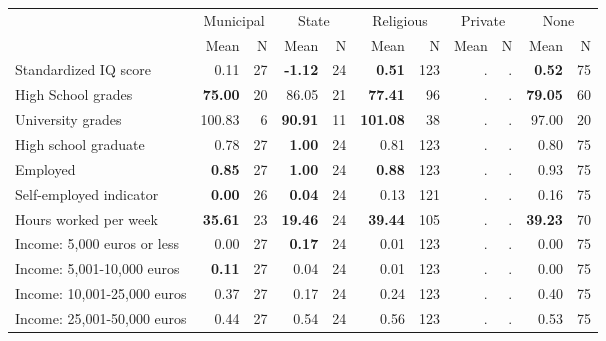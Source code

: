 \begin{tabular}{l r r r r r r r r r r}
\toprule
& \multicolumn{2}{c}{Municipal} & \multicolumn{2}{c}{State} & \multicolumn{2}{c}{Religious} & \multicolumn{2}{c}{Private} & \multicolumn{2}{c}{None} \\
& \scriptsize Mean & \scriptsize N & \scriptsize Mean & \scriptsize N & \scriptsize Mean & \scriptsize N & \scriptsize Mean & \scriptsize N & \scriptsize Mean & \scriptsize N \\
\midrule
Standardized IQ score &      0.11 &        27 & \textbf{    -1.12} &        24 & \textbf{     0.51} &       123 &         . & . & \textbf{     0.52} &        75 \\
High School grades & \textbf{    75.00} &        20 &     86.05 &        21 & \textbf{    77.41} &        96 &         . & . & \textbf{    79.05} &        60 \\
University grades &    100.83 &         6 & \textbf{    90.91} &        11 & \textbf{   101.08} &        38 &         . & . &     97.00 &        20 \\
High school graduate &      0.78 &        27 & \textbf{     1.00} &        24 &      0.81 &       123 &         . & . &      0.80 &        75 \\
Employed & \textbf{     0.85} &        27 & \textbf{     1.00} &        24 & \textbf{     0.88} &       123 &         . & . &      0.93 &        75 \\
Self-employed indicator & \textbf{     0.00} &        26 & \textbf{     0.04} &        24 &      0.13 &       121 &         . & . &      0.16 &        75 \\
Hours worked per week & \textbf{    35.61} &        23 & \textbf{    19.46} &        24 & \textbf{    39.44} &       105 &         . & . & \textbf{    39.23} &        70 \\
Income: 5,000 euros or less &      0.00 &        27 & \textbf{     0.17} &        24 &      0.01 &       123 &         . & . &      0.00 &        75 \\
Income: 5,001-10,000 euros & \textbf{     0.11} &        27 &      0.04 &        24 &      0.01 &       123 &         . & . &      0.00 &        75 \\
Income: 10,001-25,000 euros &      0.37 &        27 &      0.17 &        24 &      0.24 &       123 &         . & . &      0.40 &        75 \\
Income: 25,001-50,000 euros &      0.44 &        27 &      0.54 &        24 &      0.56 &       123 &         . & . &      0.53 &        75 \\

\end{tabular}
